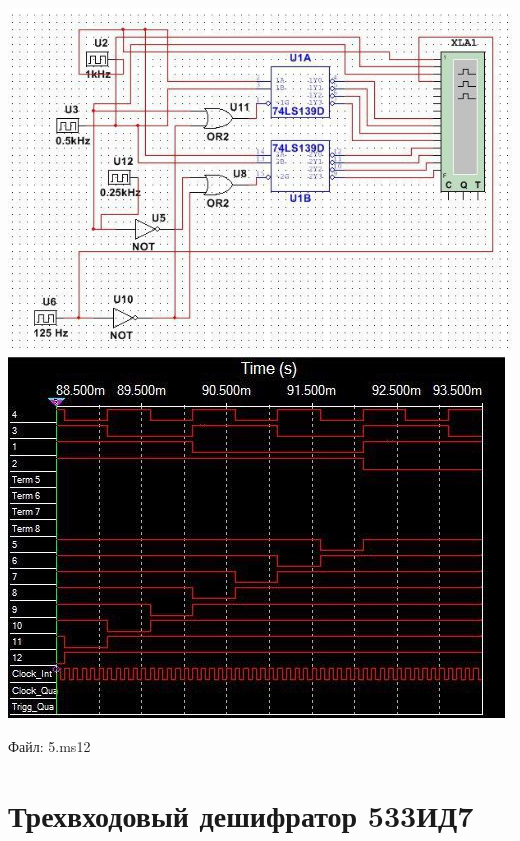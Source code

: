\documentclass[a4paper,12pt]{article}
\begin{document}
\begin{center}
	\includegraphics[scale=1]{../screens/4_1.jpg} \newline\newline 
	\includegraphics[scale=1]{../screens/4_2.jpg} \newline
\end{center}

\noindent Файл: 5.ms12

\clearpage
\section{Трехвходовый дешифратор 533ИД7}
\end{document}
